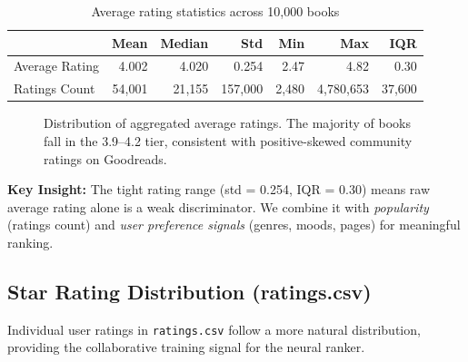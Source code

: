 \documentclass[12pt, a4paper]{article}
\newcommand{\code}[1]{\texttt{\small\color{shelfPurple}#1}}
\begin{document}
\begin{table}[H]
\centering
\caption{Average rating statistics across 10{,}000 books}
\begin{tabular}{@{}lrrrrrr@{}}
\toprule
& \textbf{Mean} & \textbf{Median} & \textbf{Std} & \textbf{Min} & \textbf{Max} & \textbf{IQR} \\
\midrule
Average Rating & 4.002 & 4.020 & 0.254 & 2.47 & 4.82 & 0.30 \\
Ratings Count & 54{,}001 & 21{,}155 & 157{,}000 & 2{,}480 & 4{,}780{,}653 & 37{,}600 \\
\bottomrule
\end{tabular}
\end{table}

\begin{figure}[H]
\centering
{}
\caption{Distribution of aggregated average ratings. The majority of books fall in the
3.9--4.2 tier, consistent with positive-skewed community ratings on Goodreads.}
\end{figure}

\begin{insightbox}
\textbf{Key Insight:} The tight rating range (std = 0.254, IQR = 0.30) means raw average
rating alone is a weak discriminator. We combine it with \emph{popularity} (ratings count)
and \emph{user preference signals} (genres, moods, pages) for meaningful ranking.
\end{insightbox}

\subsection{Star Rating Distribution (ratings.csv)}

Individual user ratings in \code{ratings.csv} follow a more natural distribution,
providing the collaborative training signal for the neural ranker.
\end{document}
